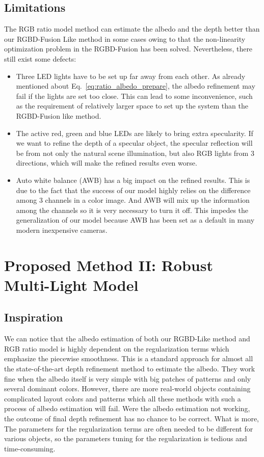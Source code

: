 \subsection{Limitations}
The RGB ratio model method can estimate the albedo and the depth better than our RGBD-Fusion Like method in some cases owing to that the non-linearity optimization problem in the RGBD-Fusion has been solved.
Nevertheless, there still exist some defects:
\begin{itemize}
\item Three LED lights have to be set up far away from each other.
    As already mentioned about Eq.~\ref{eq:ratio_albedo_prepare}, the albedo refinement may fail if the lights are set too close.
    This can lead to some inconvenience, such as the requirement of relatively larger space to set up the system than the RGBD-Fusion like method.
\item The active red, green and blue LEDs are likely to bring extra specularity.
     If we want to refine the depth of a specular object, the specular reflection will be from not only the natural scene illumination, but also RGB lights from 3 directions, which will make the refined results even worse.
     
\item Auto white balance (AWB) has a big impact on the refined results.
    This is due to the fact that the success of our model highly relies on the difference among 3 channels in a color image.
    And AWB will mix up the information among the channels so it is very necessary to turn it off.
    This impedes the generalization of our model because AWB has been set as a default in many modern inexpensive cameras.
\end{itemize}


\section{Proposed Method II: Robust Multi-Light Model}

\subsection{Inspiration}
We can notice that the albedo estimation of both our RGBD-Like method and RGB ratio model is highly dependent on the regularization terms which emphasize the piecewise smoothness.
This is a standard approach for almost all the state-of-the-art depth refinement method to estimate the albedo.
They work fine when the albedo itself is very simple with big patches of patterns and only several dominant colors.
However, there are more real-world objects containing complicated layout colors and patterns which all these methods with such a process of albedo estimation will fail.
Were the albedo estimation not working, the outcome of final depth refinement has no chance to be correct. 
What is more, The parameters for the regularization terms are often needed to be different for various objects, so the parameters tuning for the regularization is tedious and time-consuming.

